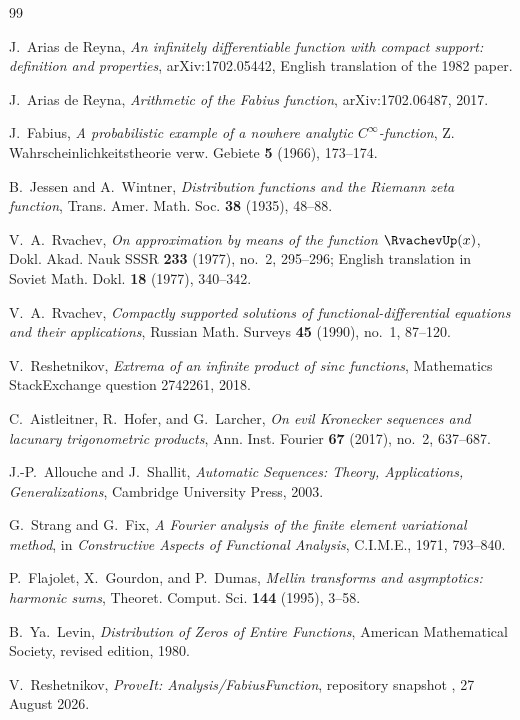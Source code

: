 \documentclass[11pt]{article}
\numberwithin{equation}{section}
\theoremstyle{definition}
\theoremstyle{remark}
\begin{document}
\begin{thebibliography}{99}

J.~Arias de Reyna,
\emph{An infinitely differentiable function with compact support: definition and properties},
arXiv:1702.05442, English translation of the 1982 paper.

J.~Arias de Reyna,
\emph{Arithmetic of the Fabius function},
arXiv:1702.06487, 2017.

J.~Fabius,
\emph{A probabilistic example of a nowhere analytic $C^\infty$-function},
Z. Wahrscheinlichkeitstheorie verw. Gebiete \textbf{5} (1966), 173--174.

B.~Jessen and A.~Wintner,
\emph{Distribution functions and the Riemann zeta function},
Trans. Amer. Math. Soc. \textbf{38} (1935), 48--88.

V.~A.~Rvachev,
\emph{On approximation by means of the function $\RvachevUp(x)$},
Dokl. Akad. Nauk SSSR \textbf{233} (1977), no.~2, 295--296;
English translation in Soviet Math. Dokl. \textbf{18} (1977), 340--342.

V.~A.~Rvachev,
\emph{Compactly supported solutions of functional-differential equations and their applications},
Russian Math. Surveys \textbf{45} (1990), no.~1, 87--120.

V.~Reshetnikov,
\emph{Extrema of an infinite product of sinc functions},
Mathematics StackExchange question 2742261, 2018.

C.~Aistleitner, R.~Hofer, and G.~Larcher,
\emph{On evil Kronecker sequences and lacunary trigonometric products},
Ann. Inst. Fourier \textbf{67} (2017), no.~2, 637--687.

J.-P.~Allouche and J.~Shallit,
\emph{Automatic Sequences: Theory, Applications, Generalizations},
Cambridge University Press, 2003.

G.~Strang and G.~Fix,
\emph{A Fourier analysis of the finite element variational method},
in \emph{Constructive Aspects of Functional Analysis}, C.I.M.E., 1971, 793--840.

P.~Flajolet, X.~Gourdon, and P.~Dumas,
\emph{Mellin transforms and asymptotics: harmonic sums},
Theoret. Comput. Sci. \textbf{144} (1995), 3--58.

B.~Ya.~Levin,
\emph{Distribution of Zeros of Entire Functions},
American Mathematical Society, revised edition, 1980.

V.~Reshetnikov,
\emph{ProveIt: Analysis/FabiusFunction}, repository snapshot
\commit, 27 August 2026.

\end{thebibliography}
\end{document}
